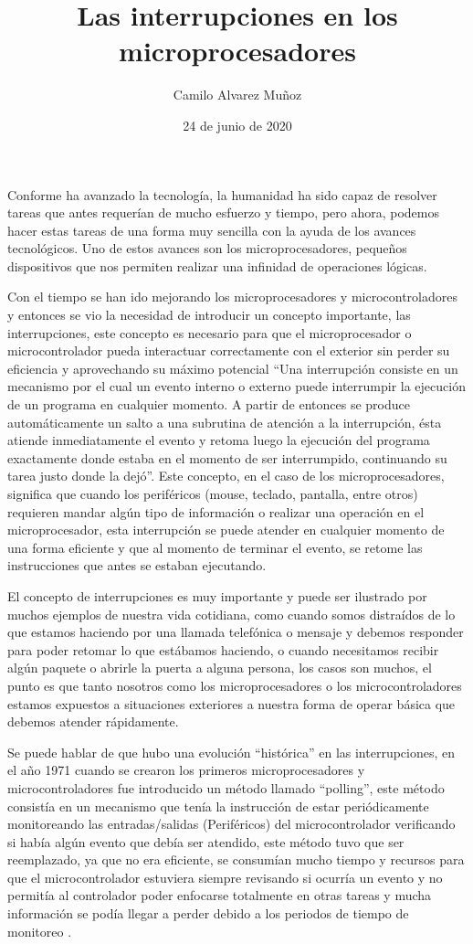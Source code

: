 \documentclass[11pt]{article}
\title{Las interrupciones en los microprocesadores}
\author{Camilo Alvarez Muñoz}
\date{24 de junio de 2020}
\begin{document}
{
\maketitle}
Conforme ha avanzado la tecnología, la humanidad ha sido capaz de resolver tareas que antes requerían de mucho esfuerzo y tiempo, pero ahora, podemos hacer estas tareas de una forma muy sencilla con la ayuda de los avances tecnológicos. Uno de estos avances son los microprocesadores, pequeños dispositivos que nos permiten realizar una infinidad de operaciones lógicas.

Con el tiempo se han ido mejorando los microprocesadores y microcontroladores y entonces se vio la necesidad de introducir un concepto importante, las interrupciones, este concepto es necesario para que el microprocesador o microcontrolador pueda interactuar correctamente con el exterior sin perder su eficiencia y aprovechando su máximo potencial “Una interrupción consiste en un mecanismo por el cual un evento interno o externo puede interrumpir la ejecución de un programa en cualquier momento. A partir de entonces se produce automáticamente un salto a una subrutina de atención a la interrupción, ésta atiende inmediatamente el evento y retoma luego la ejecución del programa exactamente donde estaba en el momento de ser interrumpido, continuando su tarea justo donde la dejó”\cite{apaza2017microcontroladores}. Este concepto, en el caso de los microprocesadores, significa que cuando los periféricos (mouse, teclado, pantalla, entre otros) requieren mandar algún tipo de información o realizar una operación en el microprocesador, esta interrupción se puede atender en cualquier momento de una forma eficiente y que al momento de terminar el evento, se retome las instrucciones que antes se estaban ejecutando.


El concepto de interrupciones es muy importante y puede ser ilustrado por muchos ejemplos de nuestra vida cotidiana, como cuando somos distraídos de lo que estamos haciendo por una llamada telefónica o mensaje y debemos responder para poder retomar lo que estábamos haciendo, o cuando necesitamos recibir algún paquete o abrirle la puerta a alguna persona, los casos son muchos, el punto es que tanto nosotros como los microprocesadores o los microcontroladores estamos expuestos a situaciones exteriores a nuestra forma de operar básica que debemos atender rápidamente.

Se puede hablar de que hubo una evolución “histórica” en las interrupciones, en el año 1971 cuando se crearon los primeros microprocesadores y microcontroladores fue introducido un método llamado “polling”, este método consistía en un mecanismo que tenía la instrucción de estar periódicamente monitoreando las entradas/salidas (Periféricos) del microcontrolador verificando si había algún evento que debía ser atendido, este método tuvo que ser reemplazado, ya que no era eficiente, se consumían mucho tiempo y recursos para que el microcontrolador estuviera siempre revisando si ocurría un evento y no permitía al controlador poder enfocarse totalmente en otras tareas y mucha información se podía llegar a perder debido a los periodos de tiempo de monitoreo \cite{reyes2015arduino}.
\end{document}
